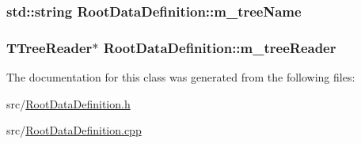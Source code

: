 \hypertarget{classRootDataDefinition_a46394bbb1863baa4abcd8cbd0413fa88}{
\subsubsection[{m\+\_\+tree\+Name}]{\setlength{\rightskip}{0pt plus 5cm}std\+::string Root\+Data\+Definition\+::m\+\_\+tree\+Name\hspace{0.3cm}{\ttfamily [protected]}}}\label{classRootDataDefinition_a46394bbb1863baa4abcd8cbd0413fa88}
\hypertarget{classRootDataDefinition_a919827bdd245e61c0f54676d59cc7448}{
\subsubsection[{m\+\_\+tree\+Reader}]{\setlength{\rightskip}{0pt plus 5cm}T\+Tree\+Reader$\ast$ Root\+Data\+Definition\+::m\+\_\+tree\+Reader\hspace{0.3cm}{\ttfamily [protected]}}}\label{classRootDataDefinition_a919827bdd245e61c0f54676d59cc7448}


The documentation for this class was generated from the following files\+:\begin{DoxyCompactItemize}
\item 
src/\hyperlink{RootDataDefinition_8h}{Root\+Data\+Definition.\+h}\item 
src/\hyperlink{RootDataDefinition_8cpp}{Root\+Data\+Definition.\+cpp}\end{DoxyCompactItemize}
